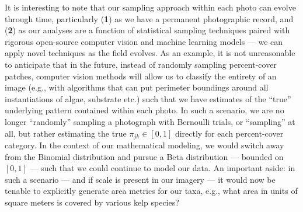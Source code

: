 \documentclass[11pt]{article}
\begin{document}
It is interesting to note that our sampling approach within each photo can
evolve through time, particularly 
(\textbf{1}) 
as we have a permanent photographic record, and 
(\textbf{2}) 
as our analyses are a function of statistical sampling techniques paired with 
rigorous open-source computer vision and machine learning models --- we can 
apply novel techniques as the field evolves.  
As an example, it is not unreasonable to anticipate that in the future, instead 
of randomly sampling percent-cover patches, computer vision methods will 
allow us to classify the entirety of an image (e.g., with algorithms that can 
put perimeter boundings around all instantiations of algae, substrate etc.) 
such that we have estimates of the ``true'' underlying pattern contained within
each photo.
In such a scenario, we are no longer ``randomly'' sampling a photograph with
Bernoulli trials, or ``sampling'' at all, but rather estimating the true
$\pi_{jk} \in [0,1]$ directly for each percent-cover category.
In the context of our mathematical modeling, we would switch away from the
Binomial distribution and pursue a Beta distribution --- bounded on $[0,1]$
--- such that we could continue to model our data.
An important aside: in such a scenario --- and if scale is present in our 
imagery --- it would now be tenable to explicitly generate area metrics for our 
taxa, e.g., what area in units of square meters is covered by various kelp 
species? 
\end{document}
